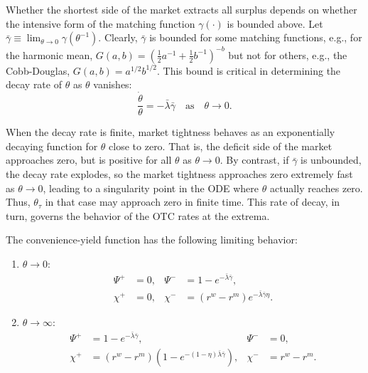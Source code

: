 \documentclass[12pt,american,english,notitlepage]{article}
\begin{document}
Whether the shortest side of the market extracts all surplus depends
on whether the intensive form of the matching function $\gamma\left(\cdot\right)$
is bounded above. Let $\bar{\gamma}\equiv\lim_{\theta\rightarrow0}\gamma\left(\theta^{-1}\right)$.
Clearly, $\bar{\gamma}$ is bounded for some matching functions, e.g.,
for the harmonic mean, $G\left(a,b\right)=\left(\frac{1}{2}a^{-1}+\frac{1}{2}b^{-1}\right)^{-b}$
but not for others, e.g., the Cobb-Douglas, $G\left(a,b\right)=a^{1/2}b^{1/2}$.
This bound is critical in determining the decay rate of $\theta$
as $\theta$ vanishes: 
\[
\frac{\dot{\theta}}{\theta}=-\bar{\lambda}\bar{\gamma}\quad\text{as}\quad\theta\rightarrow0.
\]

When the decay rate is finite, market tightness behaves as an exponentially
decaying function for $\theta$ close to zero. That is, the deficit
side of the market approaches zero, but is positive for all $\theta$
as $\theta\rightarrow0$. By contrast, if $\bar{\gamma}$ is unbounded,
the decay rate explodes, so the market tightness approaches zero extremely
fast as {$\theta\rightarrow0$}, leading
to a singularity point in the ODE where $\theta$ actually reaches
zero. Thus, $\theta_{\tau}$ in that case may approach zero in finite
time. This rate of decay, in turn, governs the behavior of the OTC
rates at the extrema. 

\begin{proposition}\label{prop:LimitBehavior.Tightness}
The  convenience-yield function has the following limiting behavior:
\begin{enumerate}
  \renewcommand{\labelenumi}{\roman{enumi}.}
  
  \item $\theta \rightarrow 0$:  
  \begin{align*}
    \Psi^+ &= 0, & \Psi^- &= 1 - e^{-\bar{\lambda} \bar{\gamma}}, \\
    \chi^+ &= 0, & \chi^- &= (r^w - r^m) e^{-\bar{\lambda} \bar{\gamma} \eta}.
  \end{align*}
  
   \vspace{-12pt}
   
  \item $\theta \rightarrow \infty$:  
  \begin{align*}
    \Psi^+ &= 1 - e^{-\bar{\lambda} \bar{\gamma}}, & \Psi^- &= 0, \\
    \chi^+ &= (r^w - r^m)\left(1 - e^{-(1 - \eta)\bar{\lambda} \bar{\gamma}}\right), 
    & \chi^- &= r^w - r^m.
  \end{align*}

\end{enumerate}

\end{proposition}
\end{document}
